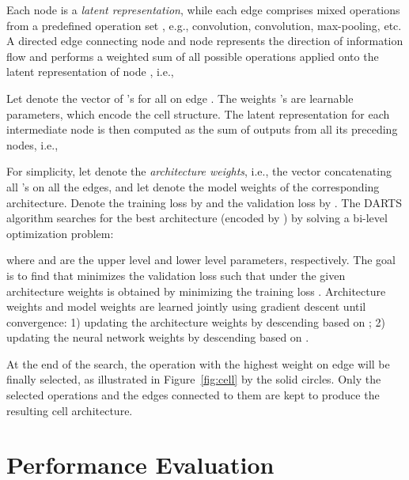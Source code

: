 \documentclass[a4paper]{article}
\begin{document}
Each node is a \textit{latent representation}, while each edge comprises mixed operations from a predefined operation set , e.g.,  convolution,  convolution, max-pooling, etc. 
A directed edge connecting node  and node  represents the direction of information flow and performs a weighted sum  of all possible operations  applied onto the latent representation  of node ,  i.e., 

Let  denote the vector of 's for all  on edge .
The weights 's are learnable parameters, which encode the cell structure.
The latent representation  for each intermediate node  is then computed as the sum of outputs from all its preceding nodes, i.e., 

For simplicity, let  denote the \textit{architecture weights}, i.e., the vector concatenating all 's on all the edges, and let  denote the model weights of the corresponding architecture. 
Denote the training loss by  and the validation loss by .
The DARTS algorithm searches for the best architecture (encoded by ) by solving a bi-level optimization problem: 

where  and  are the upper level and lower level parameters, respectively.
The goal is to find  that minimizes the validation loss  such that  under the given architecture weights  is obtained by minimizing the training loss . Architecture weights  and model weights  are learned jointly using gradient descent \cite{liu2018darts} until convergence: 1) updating the architecture weights  by descending based on ; 2) updating the neural network weights  by descending  based on .
      
At the end of the search, the operation  with the highest weight  on edge  will be finally selected, as illustrated in Figure~\ref{fig:cell} by the solid circles. Only the selected operations and the edges connected to them are kept to produce the resulting cell architecture. 












\section{Performance Evaluation}
\label{sec:experiment}
\end{document}
